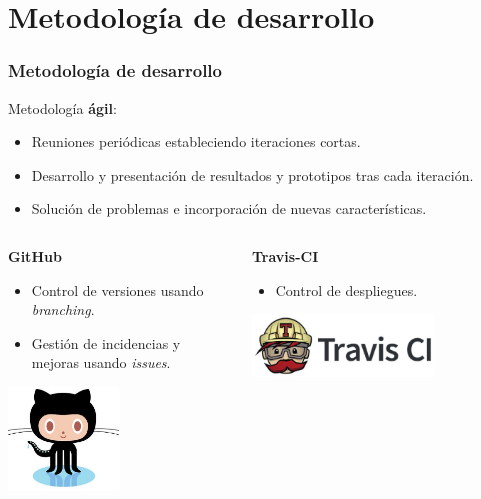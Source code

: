 \documentclass{beamer}
\begin{document}

\section{Metodología de desarrollo}
\begin{frame}[allowframebreaks]
  \frametitle{Metodología de desarrollo}
  
  Metodología {\bfseries ágil}:
  \begin{itemize}
    \item Reuniones periódicas estableciendo iteraciones cortas.
    \item Desarrollo y presentación de resultados y prototipos tras cada iteración.
    \item Solución de problemas e incorporación de nuevas características. 
  \end{itemize}
  \framebreak
    
  
  \begin{columns}
    \begin{column}{5cm}
    	{\bfseries GitHub}
      \begin{itemize}
        \item Control de versiones usando \textit{branching}.
        \item Gestión de incidencias y mejoras usando \textit{issues}.
      \end{itemize}
      \includegraphics[width=0.5\textwidth]{images/octocat.eps}
    \end{column}
    \begin{column}{5cm}
    {\bfseries Travis-CI}
    \begin{itemize}
        \item Control de despliegues.
      \end{itemize}

        \includegraphics[width=0.7\textwidth]{images/travis-ci-logo.eps}

    \end{column}
  \end{columns}
  
\end{frame}
\end{document}
